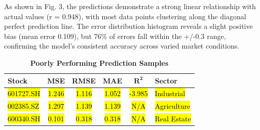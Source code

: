 \documentclass[3p,times,procedia]{elsarticle}
\begin{document}
As shown in Fig. 3, the predictions demonstrate a strong linear relationship with actual values (r = 0.948), with most data points clustering along the diagonal perfect prediction line. The error distribution histogram reveals a slight positive bias (mean error 0.109), but 76\% of errors fall within the +/-0.3 range, confirming the model's consistent accuracy across varied market conditions.



\begin{table}[!ht]\footnotesize
\renewcommand{\arraystretch}{1.1}
\centering
\caption{\textbf{Poorly Performing Prediction Samples}}
\begin{tabular}{|l|c|c|c|c|l|}
\hline
\textbf{Stock} & \textbf{MSE} & \textbf{RMSE} & \textbf{MAE} & \textbf{$\mathbf{R^2}$} & \textbf{Sector} \\
\hline
\hl{601727.SH} & \hl{1.246} & \hl{1.116} & \hl{1.052} & \hl{-3.985} & \hl{Industrial} \\
\hl{002385.SZ} & \hl{1.297} & \hl{1.139} & \hl{1.139} & \hl{N/A} & \hl{Agriculture} \\
\hl{600340.SH} & \hl{0.101} & \hl{0.318} & \hl{0.318} & \hl{N/A} & \hl{Real Estate} \\
\hline
\end{tabular}
\end{table}

\end{document}
